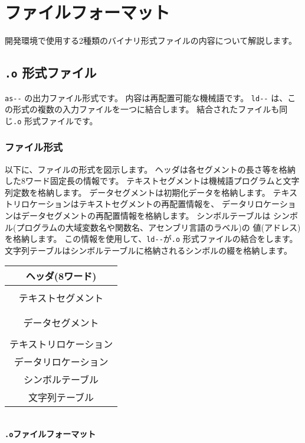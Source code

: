 % 
%
\chapter{ファイルフォーマット}

\tac 開発環境で使用する2種類のバイナリ形式ファイルの内容について解説します。

\section{{\tt .o} 形式ファイル}
\label{app:oformat}

\verb/as--/ の出力ファイル形式です。
内容は再配置可能な機械語です。
\verb/ld--/ は、この形式の複数の入力ファイルを一つに結合します。
結合されたファイルも同じ{\tt .o} 形式ファイルです。

\subsection{ファイル形式}

以下に、ファイルの形式を図示します。
ヘッダは各セグメントの長さ等を格納した8ワード固定長の情報です。
テキストセグメントは機械語プログラムと文字列定数を格納します。
データセグメントは初期化データを格納します。
テキストリロケーションはテキストセグメントの再配置情報を、
データリロケーションはデータセグメントの再配置情報を格納します。
シンボルテーブルは
シンボル(\cmm プログラムの大域変数名や関数名、アセンブリ言語のラベル)の
値(アドレス)を格納します。
この情報を使用して、\verb/ld--/が{\tt .o} 形式ファイルの結合をします。
文字列テーブルはシンボルテーブルに格納されるシンボルの綴を格納します。

\begin{myminipage}
\begin{tabular}{|c|}
\hline
ヘッダ(8ワード) \\
\hline
\\
テキストセグメント \\
\\
\hline
\\
データセグメント \\
\\
\hline
テキストリロケーション \\
\hline
データリロケーション \\
\hline
シンボルテーブル \\
\hline
文字列テーブル \\
\hline
\end{tabular}
\\\vspace{0.2cm}
{\bf {\tt .o}ファイルフォーマット}
\end{myminipage}


